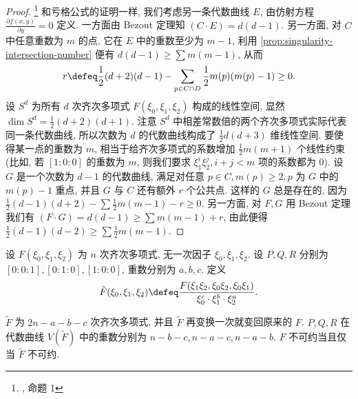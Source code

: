 \begin{proof}
\footnote{\cite{notes}, 命题 1}
和亏格公式的证明一样, 我们考虑另一条代数曲线 $E$,
由仿射方程 $\frac{\partial f(x,y)}{\partial y} = 0$ 定义.
一方面由 Bezout 定理知 $(C\cdot E) = d(d-1)$.
另一方面, 对 $C$ 中任意重数为 $m$ 的点,
它在 $E$ 中的重数至少为 $m - 1$,
利用 \cref{prop:singularity-intersection-number} 便有
$d(d-1) \ge \sum m(m-1)$, 从而
\[r\defeq \frac{1}{2}(d+2)(d-1)-\sum_{p \in C\cap D}\frac{1}{2}m(p)(m(p) - 1)\ge 0.\]
设 $S^d$ 为所有 $d$ 次齐次多项式 $F(\xi_0,\xi_1,\xi_2)$ 构成的线性空间,
显然 $\dim S^d = \frac{1}{2}(d+2)(d+1)$.
注意 $S^d$ 中相差常数倍的两个齐次多项式实际代表同一条代数曲线,
所以次数为 $d$ 的代数曲线构成了 $\frac{1}{2}d(d+3)$ 维线性空间.
要使得某一点的重数为 $m$, 相当于给齐次多项式的系数增加 $\frac{1}{2}m(m+1)$ 个线性约束(比如,
若 $[1:0:0]$ 的重数为 $m$, 则我们要求 $\xi_1^i\xi_2^j, i+j < m$ 项的系数都为 $0$).
设 $G$ 是一个次数为 $d-1$ 的代数曲线,
满足对任意 $p \in C, m(p) \ge 2, p$ 为 $G$ 中的 $m(p)-1$ 重点,
并且 $G$ 与 $C$ 还有额外 $r$ 个公共点.
这样的 $G$ 总是存在的, 因为 $\frac{1}{2}(d-1)(d+2) - \sum\frac{1}{2}m(m-1) - r \ge 0$.
另一方面, 对 $F,G$ 用 Bezout 定理我们有 $(F\cdot G) = d(d-1) \ge \sum m(m-1) + r$,
由此便得 $\frac{1}{2}(d-1)(d-2) \ge \sum\frac{1}{2}m(m-1)$.
\end{proof}

\begin{lem}
\label{lem:transformation-property}
设 $F(\xi_0,\xi_1,\xi_2)$ 为 $n$ 次齐次多项式,
无一次因子 $\xi_0, \xi_1, \xi_2$.
设 $P,Q,R$ 分别为 $[0:0:1], [0:1:0], [1:0:0]$,
重数分别为 $a,b,c$.
定义
\begin{equation}
\label{eq:transformation}
\tilde{F}(\xi_0,\xi_1,\xi_2) \defeq \frac{F(\xi_1\xi_2, \xi_0\xi_2, \xi_0\xi_1)}{\xi_0^c\cdot\xi_1^b\cdot\xi_2^a}.
\end{equation}
\begin{enumerate}[label=\normalfont(\roman*)]
    \ii $\tilde{F}$ 为 $2n-a-b-c$ 次齐次多项式,
    并且 $\tilde{F}$ 再变换一次就变回原来的 $F$.
    \ii $P,Q,R$ 在代数曲线 $V(\tilde{F})$ 中的重数分别为
    $n-b-c,n-a-c,n-a-b$.
    \ii $F$ 不可约当且仅当 $\tilde{F}$ 不可约.
\end{enumerate}
\end{lem}

